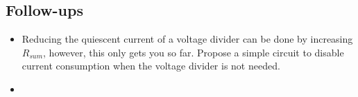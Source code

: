 \documentclass[main.tex]{subfiles}
\begin{document}
\subsection{Follow-ups}
\begin{itemize}
    \item Reducing the quiescent current of a voltage divider can be done by increasing $R_{sum}$, however, this only gets you so far. Propose a simple circuit to disable current consumption when the voltage divider is not needed. 
    \item 
\end{itemize}
\end{document}
